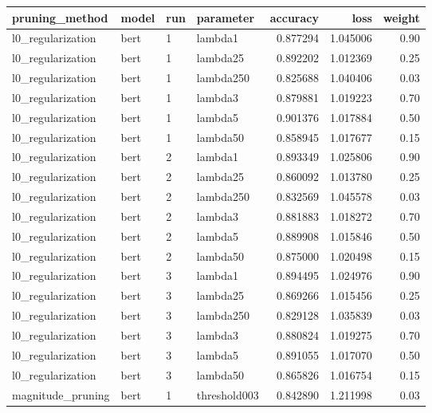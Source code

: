 \begin{tabular}{llllrrr}
\toprule
       pruning\_method & model & run &    parameter &  accuracy &     loss &  weight \\
\midrule
    l0\_regularization &  bert &   1 &      lambda1 &  0.877294 & 1.045006 &    0.90 \\
    l0\_regularization &  bert &   1 &     lambda25 &  0.892202 & 1.012369 &    0.25 \\
    l0\_regularization &  bert &   1 &    lambda250 &  0.825688 & 1.040406 &    0.03 \\
    l0\_regularization &  bert &   1 &      lambda3 &  0.879881 & 1.019223 &    0.70 \\
    l0\_regularization &  bert &   1 &      lambda5 &  0.901376 & 1.017884 &    0.50 \\
    l0\_regularization &  bert &   1 &     lambda50 &  0.858945 & 1.017677 &    0.15 \\
    l0\_regularization &  bert &   2 &      lambda1 &  0.893349 & 1.025806 &    0.90 \\
    l0\_regularization &  bert &   2 &     lambda25 &  0.860092 & 1.013780 &    0.25 \\
    l0\_regularization &  bert &   2 &    lambda250 &  0.832569 & 1.045578 &    0.03 \\
    l0\_regularization &  bert &   2 &      lambda3 &  0.881883 & 1.018272 &    0.70 \\
    l0\_regularization &  bert &   2 &      lambda5 &  0.889908 & 1.015846 &    0.50 \\
    l0\_regularization &  bert &   2 &     lambda50 &  0.875000 & 1.020498 &    0.15 \\
    l0\_regularization &  bert &   3 &      lambda1 &  0.894495 & 1.024976 &    0.90 \\
    l0\_regularization &  bert &   3 &     lambda25 &  0.869266 & 1.015456 &    0.25 \\
    l0\_regularization &  bert &   3 &    lambda250 &  0.829128 & 1.035839 &    0.03 \\
    l0\_regularization &  bert &   3 &      lambda3 &  0.880824 & 1.019275 &    0.70 \\
    l0\_regularization &  bert &   3 &      lambda5 &  0.891055 & 1.017070 &    0.50 \\
    l0\_regularization &  bert &   3 &     lambda50 &  0.865826 & 1.016754 &    0.15 \\
    magnitude\_pruning &  bert &   1 & threshold003 &  0.842890 & 1.211998 &    0.03 \\

\end{tabular}
